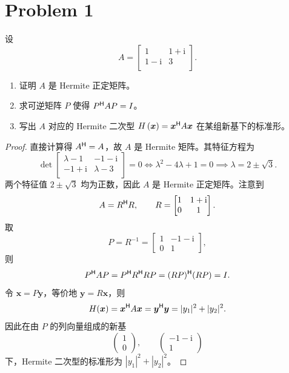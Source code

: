 \section*{Problem 1}

设 \[
A = \begin{bmatrix}
    1 & 1 + \mathrm{i} \\
    1 - \mathrm{i} & 3 \\
\end{bmatrix}.
\]

\begin{enumerate}
    \item 证明 $A$ 是 Hermite 正定矩阵。
    \item 求可逆矩阵 $P$ 使得 $P^{\mathsf{H}} A P = I$。
    \item 写出 $A$ 对应的 Hermite 二次型 $H \left(\bm{x}\right) = \bm{x}^{\mathsf{H}} A \bm{x}$ 在某组新基下的标准形。
\end{enumerate}

\begin{proof}
    直接计算得 $A^{\mathsf{H}}=A$，故 $A$ 是 Hermite 矩阵。其特征方程为
    \[
        \det\begin{bmatrix}
            \lambda - 1 & -1 - \mathrm{i} \\
            -1 + \mathrm{i} & \lambda - 3 \\
        \end{bmatrix} = 0 \iff \lambda^2 - 4\lambda + 1 = 0 \implies \lambda = 2 \pm \sqrt{3}.
    \]
    两个特征值 $2\pm\sqrt3$ 均为正数，因此 $A$ 是 Hermite 正定矩阵。注意到
    \[
        A=R^{\mathsf{H}} R,\qquad
        R=\begin{bmatrix}1&1+\mathrm{i}\\0&1\end{bmatrix}.
    \]
    取
    \[
        P=R^{-1}
        =\begin{bmatrix}1&-1-\mathrm{i}\\0&1\end{bmatrix},
    \]
    则
    \[
        P^{\mathsf{H}} A P=P^{\mathsf{H}} R^{\mathsf{H}} RP=(RP)^{\mathsf{H}}(RP)=I.
    \]
    令 $\bm x=P\bm y$，等价地 $\bm y=R\bm x$，则
    \[
        H(\bm x)=\bm x^{\mathsf{H}} A\bm x=\bm y^{\mathsf{H}}\bm y
        =|y_1|^2+|y_2|^2.
    \]
    因此在由 $P$ 的列向量组成的新基
    \[
        \begin{pmatrix}1\\0\end{pmatrix},\qquad
        \begin{pmatrix}-1-\mathrm{i}\\1\end{pmatrix}
    \]
    下，Hermite 二次型的标准形为 $|y_1|^2+|y_2|^2$。
\end{proof}

